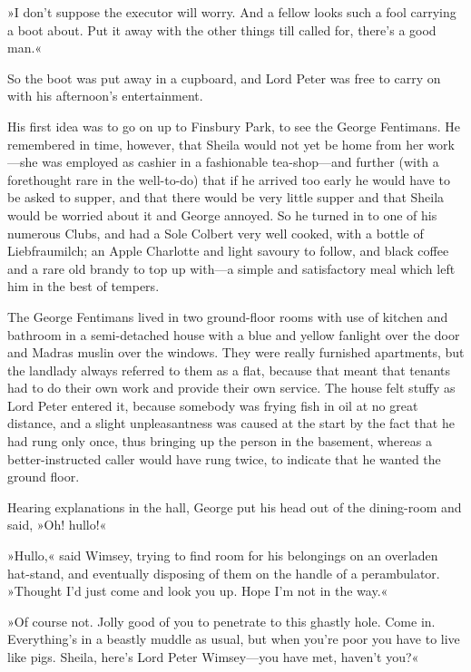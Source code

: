 »I don't suppose the executor will worry. And a fellow looks such a fool carrying a boot about. Put it away with the other things till called for, there's a good man.«

So the boot was put away in a cupboard, and Lord Peter was free to carry on with his afternoon's entertainment.

His first idea was to go on up to Finsbury Park, to see the George Fentimans. He remembered in time, however, that Sheila would not yet be home from her work\allowbreak---\allowbreak she was employed as cashier in a fashionable tea-shop\allowbreak---\allowbreak and further (with a forethought rare in the well-to-do) that if he arrived too early he would have to be asked to supper, and that there would be very little supper and that Sheila would be worried about it and George annoyed. So he turned in to one of his numerous Clubs, and had a Sole Colbert very well cooked, with a bottle of Liebfraumilch; an Apple Charlotte and light savoury to follow, and black coffee and a rare old brandy to top up with\allowbreak---\allowbreak a simple and satisfactory meal which left him in the best of tempers.

The George Fentimans lived in two ground-floor rooms with use of kitchen and bathroom in a semi-detached house with a blue and yellow fanlight over the door and Madras muslin over the windows. They were really furnished apartments, but the landlady always referred to them as a flat, because that meant that tenants had to do their own work and provide their own service. The house felt stuffy as Lord Peter entered it, because somebody was frying fish in oil at no great distance, and a slight unpleasantness was caused at the start by the fact that he had rung only once, thus bringing up the person in the basement, whereas a better-instructed caller would have rung twice, to indicate that he wanted the ground floor.

Hearing explanations in the hall, George put his head out of the dining-room and said, »Oh! hullo!«

»Hullo,« said Wimsey, trying to find room for his belongings on an overladen hat-stand, and eventually disposing of them on the handle of a perambulator. »Thought I'd just come and look you up. Hope I'm not in the way.«

»Of course not. Jolly good of you to penetrate to this ghastly hole. Come in. Everything's in a beastly muddle as usual, but when you're poor you have to live like pigs. Sheila, here's Lord Peter Wimsey\allowbreak---\allowbreak you have met, haven't you?«


